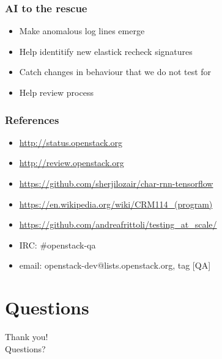 \documentclass[aspectratio=169,11pt,hyperref={colorlinks=true}]{beamer}
\begin{document}
\begin{frame}
    \frametitle{AI to the rescue}
    \begin{itemize}
        \item{Make anomalous log lines emerge}
    \end{itemize}
    \begin{itemize}
        \item{Help identitify new elastick recheck signatures}
        \item{Catch changes in behaviour that we do not test for}
        \item{Help review process}
    \end{itemize}
\end{frame}

\begin{frame}
    \frametitle{References}
    \begin{itemize}
        \item{\href{http://status.openstack.org}{http://status.openstack.org}}
        \item{\href{http://review.openstack.org}{http://review.openstack.org}}
        \item{\href{https://github.com/sherjilozair/char-rnn-tensorflow}{https://github.com/sherjilozair/char-rnn-tensorflow}}
        \item{\href{https://en.wikipedia.org/wiki/CRM114\_(program)}{https://en.wikipedia.org/wiki/CRM114\_(program)}}
        \item{\href{https://github.com/andreafrittoli/testing\_at\_scale/}{https://github.com/andreafrittoli/testing\_at\_scale/}}
    \end{itemize}
    \begin{itemize}
        \item{IRC: \#openstack-qa}
        \item{email: openstack-dev@lists.openstack.org, tag [QA]}
    \end{itemize}
\end{frame}


\section{Questions}
\begin{frame}[c]
    \begin{center}
        \Huge Thank you!\\Questions?
    \end{center}
\end{frame}
\end{document}
